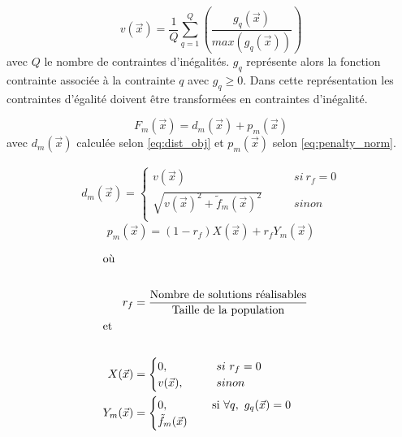 \begin{equation}\label{eq:norm_contrainte}
  v(\vec{x}) = \frac{1}{Q} \sum_{q=1}^{Q} \left(\frac{g_{q}(\vec{x})}{max(g_{q}(\vec{x}))}\right)
\end{equation}
avec $Q$ le nombre de contraintes d’inégalités. $g_{q}$ représente alors la fonction contrainte
associée à la contrainte $q$ avec $g_{q} \geq 0$. Dans cette représentation les contraintes
d’égalité doivent être transformées en contraintes d’inégalité.

\begin{equation}\label{eq:calc_modif_obj}
  F_{m}(\vec{x}) = d_{m}(\vec{x}) + p_{m}(\vec{x})
\end{equation}
avec $d_{m}(\vec{x})$ calculée selon \eqref{eq:dist_obj} et $ p_{m}(\vec{x})$ selon \eqref{eq:penalty_norm}.


\begin{align}\label{eq:dist_obj}
  d_{m}(\vec{x}) = \begin{cases}
                          v(\vec{x})                                     & \qquad si\  r_{f} = 0 \\
                          \sqrt{v(\vec{x})^2 + \tilde{f}_{m}(\vec{x})^2} & \qquad sinon          \\
                    \end{cases}
\end{align}
\begin{equation}\label{eq:penalty_norm}
  p_{m}(\vec{x}) = (1 - r_{f})  X(\vec{x}) + r_{f} Y_{m}(\vec{x})
\end{equation}

\begin{align*}
  \shortintertext{où} \\
    r_{f} &= \frac{\text{Nombre de solutions réalisables}}{\text{Taille de la population}} \\
  \shortintertext{et} \\
  X(\vec{x})     &= \begin{cases}
                0,          \qquad     & si\  r_{f} = 0\\
                v(\vec{x}), \qquad     & sinon\\
                \end{cases} \\
  Y_{m}(\vec{x}) &= \begin{cases}
                    0,          \quad \qquad & \text{si} \ \forall q, \ g_{q}(\vec{x}) = 0\\
                      \tilde{f}_{m}(\vec{x})  \\
            \end{cases}\\
\end{align*}


